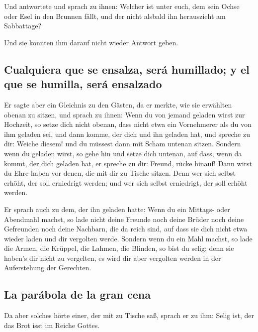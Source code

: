  Und antwortete und sprach zu ihnen: Welcher ist unter
euch, dem sein Ochse oder Esel in den Brunnen fällt, und der nicht
alsbald ihn herauszieht am Sabbattage?

 Und sie konnten ihm darauf nicht wieder Antwort geben.

\hypertarget{cualquiera-que-se-ensalza-seruxe1-humillado-y-el-que-se-humilla-seruxe1-ensalzado}{%
\subsection{Cualquiera que se ensalza, será humillado; y el que se
humilla, será
ensalzado}\label{cualquiera-que-se-ensalza-seruxe1-humillado-y-el-que-se-humilla-seruxe1-ensalzado}}

 Er sagte aber ein Gleichnis zu den Gästen, da er merkte,
wie sie erwählten obenan zu sitzen, und sprach zu ihnen: 
Wenn du von jemand geladen wirst zur Hochzeit, so setze dich nicht
obenan, dass nicht etwa ein Vornehmerer als du von ihm geladen sei,
 und dann komme, der dich und ihn geladen hat, und spreche
zu dir: Weiche diesem! und du müssest dann mit Scham untenan sitzen.
 Sondern wenn du geladen wirst, so gehe hin und setze
dich untenan, auf dass, wenn da kommt, der dich geladen hat, er spreche
zu dir: Freund, rücke hinauf! Dann wirst du Ehre haben vor denen, die
mit dir zu Tische sitzen.  Denn wer sich selbst erhöht,
der soll erniedrigt werden; und wer sich selbst erniedrigt, der soll
erhöht werden.

 Er sprach auch zu dem, der ihn geladen hatte: Wenn du
ein Mittags- oder Abendmahl machst, so lade nicht deine Freunde noch
deine Brüder noch deine Gefreunden noch deine Nachbarn, die da reich
sind, auf dass sie dich nicht etwa wieder laden und dir vergolten werde.
 Sondern wenn du ein Mahl machst, so lade die Armen, die
Krüppel, die Lahmen, die Blinden,  so bist du selig; denn
sie haben's dir nicht zu vergelten, es wird dir aber vergolten werden in
der Auferstehung der Gerechten.

\hypertarget{la-paruxe1bola-de-la-gran-cena}{%
\subsection{La parábola de la gran
cena}\label{la-paruxe1bola-de-la-gran-cena}}

 Da aber solches hörte einer, der mit zu Tische saß,
sprach er zu ihm: Selig ist, der das Brot isst im Reiche Gottes.

